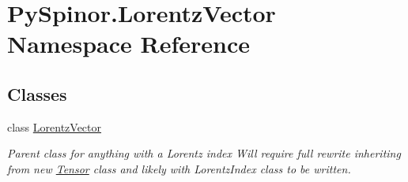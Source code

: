 \hypertarget{namespace_py_spinor_1_1_lorentz_vector}{}\section{Py\+Spinor.\+Lorentz\+Vector Namespace Reference}
\label{namespace_py_spinor_1_1_lorentz_vector}
\subsection*{Classes}
\begin{DoxyCompactItemize}
\item 
class \hyperlink{class_py_spinor_1_1_lorentz_vector_1_1_lorentz_vector}{Lorentz\+Vector}
\begin{DoxyCompactList}\small\item\em Parent class for anything with a Lorentz index Will require full rewrite inheriting from new \hyperlink{namespace_py_spinor_1_1_tensor}{Tensor} class and likely with Lorentz\+Index class to be written. \end{DoxyCompactList}\end{DoxyCompactItemize}
